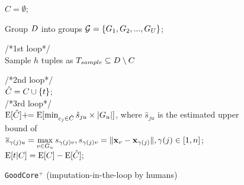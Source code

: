 
\begin{figure}[!t]
 \vspace{-1em}
	\begin{algorithm}[H]
		\normalem
	\caption{\texttt{GoodCore}$^+$ (imputation-in-the-loop by humans) \label{alg:group}}
		{\small
			
		
		
		$C=\emptyset$;\\
		
		Group $D$ into groups $\mathcal{G} = \{ G_1, G_2, ..., G_U \}$;\\
		
		\While{$|\core|< \numcore$}
		{
			
		/*1st loop*/  \\
		
		Sample $h$ tuples as $T_{sample} \subseteq D \setminus C$\\
		
			{
				
				/*2nd loop*/ \\
				 $\hat{C} = C \cup \{t\}$;\\
				 {
				 	/*3rd loop*/ \\
				 
				 		$\mathrm{E}[\hat{C}] +\!\!= \mathrm{E}[\min_{c_j\in \hat{C}}\hat{s}_{ju} \times |G_u|]$, where $\hat{s}_{ju}$ is the estimated upper bound of \\\quad\quad  $\overline{s}_{\gamma(j)u} = \max\limits_{v \in G_u} s_{\gamma(j)v}, s_{\gamma(j)v} = \lVert\mathbf{x}_v - \mathbf{x}_{\gamma(j)}\rVert, \gamma(j)\in[1, n]$;\\
			     }
		         $\mathrm{E}[t|C] = \mathrm{E}[C] - \mathrm{E}[\hat{C}];$
				 
}}}
\end{algorithm}
\end{figure}

